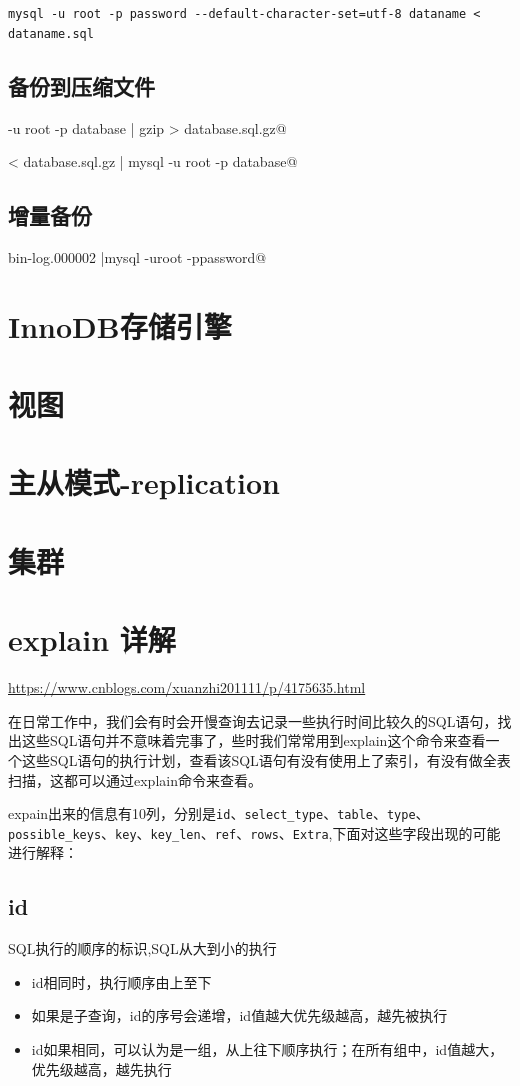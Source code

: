 \documentclass[UTF8,a4paper,12pt]{ctexbook}
\begin{document}
			\verb|mysql -u root -p password --default-character-set=utf-8 dataname < dataname.sql|
		\subsection{备份到压缩文件}
			\verb@mysqldump -u root -p database | gzip > database.sql.gz@
			
			\verb@gzip < database.sql.gz | mysql -u root -p database@
		\subsection{增量备份}
			\verb@mysqlbinlog bin-log.000002 |mysql -uroot -ppassword@
		
	\section{InnoDB存储引擎}
	
	\section{视图}

	\section{主从模式-replication}
	
	\section{集群}

	\section{explain 详解}
		\url{https://www.cnblogs.com/xuanzhi201111/p/4175635.html}
		
		在日常工作中，我们会有时会开慢查询去记录一些执行时间比较久的SQL语句，找出这些SQL语句并不意味着完事了，些时我们常常用到explain这个命令来查看一个这些SQL语句的执行计划，查看该SQL语句有没有使用上了索引，有没有做全表扫描，这都可以通过explain命令来查看。
		
		expain出来的信息有10列，分别是\verb|id|、\verb|select_type|、\verb|table|、\verb|type|、\verb|possible_keys|、\verb|key|、\verb|key_len|、\verb|ref|、\verb|rows|、\verb|Extra|,下面对这些字段出现的可能进行解释：
		
		\subsection{id}
			SQL执行的顺序的标识,SQL从大到小的执行
			\begin{itemize}
				\item id相同时，执行顺序由上至下
				\item 如果是子查询，id的序号会递增，id值越大优先级越高，越先被执行
				\item id如果相同，可以认为是一组，从上往下顺序执行；在所有组中，id值越大，优先级越高，越先执行
			\end{itemize}
			
\end{document}
